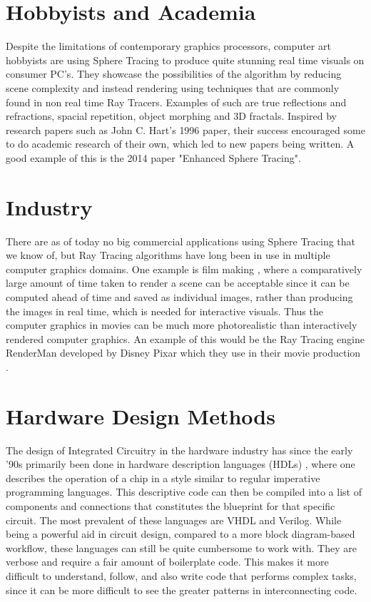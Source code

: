 	\section{ Hobbyists and Academia }

		Despite the limitations of contemporary graphics processors, computer
		art hobbyists are using Sphere Tracing to produce quite stunning real
		time visuals on consumer PC's. They showcase the possibilities of the
		algorithm by reducing scene complexity and instead rendering using
		techniques that are commonly found in non real time Ray Tracers.
		Examples of such are true reflections and refractions, spacial
		repetition, object morphing and 3D fractals\cite{InigoQuilez}. 
		Inspired by research papers such as John C. Hart's 1996
		paper\cite{Hart1996}, their success encouraged some to do academic
		research of their own, which led to new papers being written. A good
		example of this is the 2014 paper "Enhanced Sphere
		Tracing"\cite{Korndorfer2014}.

	\section{ Industry }		

		There are as of today no big commercial applications using Sphere
		Tracing that we know of, but Ray Tracing algorithms have long been in
		use in multiple computer graphics domains. One example is film
		making \cite{Christensen2006}, where a comparatively large amount of
		time taken to render a scene can be acceptable since it can be computed
		ahead of time and saved as individual images, rather than producing
		the images in real time, which is needed for interactive visuals.
		Thus the computer graphics in movies can be much more photorealistic
		than interactively rendered computer graphics. An example of this
		would be the Ray Tracing engine RenderMan developed by Disney Pixar
		which they use in their movie production \cite{Christensen2006}.

	\section{ Hardware Design Methods } 
	
		The design of Integrated Circuitry in the hardware industry has since
		the early '90s primarily been done in hardware description languages
		(HDLs) \cite{Chen2012}, where one describes the operation of a chip in a
		style similar to regular imperative programming languages. This
		descriptive code can then be compiled into a list of components and
		connections that constitutes the blueprint for that specific circuit.
		The most prevalent of these languages are VHDL and 
		Verilog\cite{Chen2012}. While being a powerful aid in circuit design,
		compared to a more block diagram-based workflow\cite{Lauwereins},
		these languages can still be quite cumbersome to work with. They are
		verbose and require a fair amount of boilerplate code. This makes it
		more difficult to understand, follow, and also write code that
		performs complex tasks, since it can be more difficult to see the
		greater patterns in interconnecting code.
		
